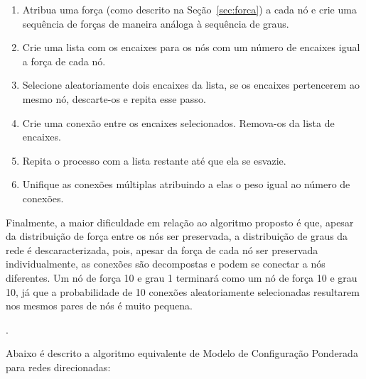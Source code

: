 \documentclass[12pt,a4paper]{article}
\theoremstyle{hypo}
\begin{document}
\begin{enumerate}
\item Atribua uma força (como descrito na Seção~\ref{sec:forca}) a cada nó e crie uma sequência de forças de maneira análoga à sequência de graus.
\item Crie uma lista com os encaixes para os nós com um número de encaixes igual a força de cada nó.
\item Selecione aleatoriamente dois encaixes da lista, se os encaixes pertencerem ao mesmo nó, descarte-os e repita esse passo.
\item Crie uma conexão entre os encaixes selecionados. Remova-os da lista de encaixes.
\item Repita o processo com a lista restante até que ela se esvazie.
\item Unifique as conexões múltiplas atribuindo a elas o peso igual ao número de conexões.
\end{enumerate}


Finalmente, a maior dificuldade em relação ao algoritmo proposto é que, apesar da distribuição de força entre os nós ser preservada, a distribuição de graus da rede é descaracterizada, pois, apesar da força de cada nó ser preservada individualmente, as conexões são decompostas e podem se conectar a nós diferentes. Um nó de força 10 e grau 1 terminará como um nó de força 10 e grau 10, já que a probabilidade de 10 conexões aleatoriamente selecionadas resultarem nos mesmos pares de nós é muito pequena.

.

Abaixo é descrito a algoritmo equivalente de Modelo de Configuração Ponderada para redes direcionadas:
\end{document}
